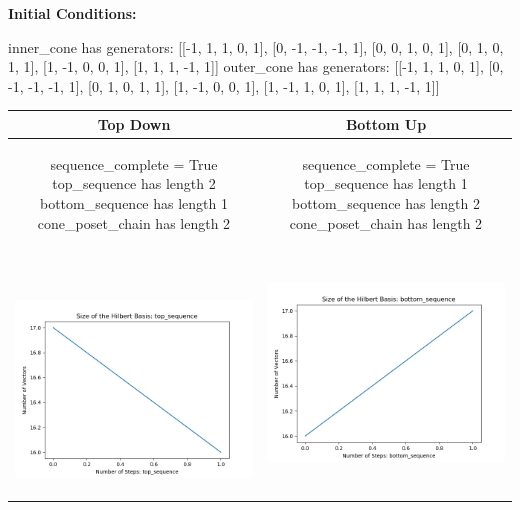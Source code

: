 \documentclass[10pt]{article}
\begin{document}
\textbf{Initial Conditions:}
\begin{SAGE}
inner_cone has generators: 
[[-1, 1, 1, 0, 1], [0, -1, -1, -1, 1], [0, 0, 1, 0, 1], [0, 1, 0, 1, 1], [1, -1, 0, 0, 1], [1, 1, 1, -1, 1]]
outer_cone has generators: 
[[-1, 1, 1, 0, 1], [0, -1, -1, -1, 1], [0, 1, 0, 1, 1], [1, -1, 0, 0, 1], [1, -1, 1, 0, 1], [1, 1, 1, -1, 1]]

\end{SAGE}
\begin{tabular}{c|c}
\textbf{Top Down} & \textbf{Bottom Up} \\ \hline  
\begin{SAGE}
	sequence_complete = True
	top_sequence has length 2
	bottom_sequence has length 1
	cone_poset_chain has length 2
\end{SAGE} 
&
\begin{SAGE}
	sequence_complete = True
	top_sequence has length 1
	bottom_sequence has length 2
	cone_poset_chain has length 2
\end{SAGE} 
\\ \hline
\
\begin{minipage}{.45\textwidth}
\includegraphics[width=\textwidth]{"DATA/5d/6 generators 1 bound B/top_sequence SIZE"}
\end{minipage} &
\begin{minipage}{.45\textwidth}
\includegraphics[width=\textwidth]{"DATA/5d/6 generators 1 bound B bottomup/bottom_sequence SIZE"}

\end{minipage}
\end{tabular}
\end{document}
